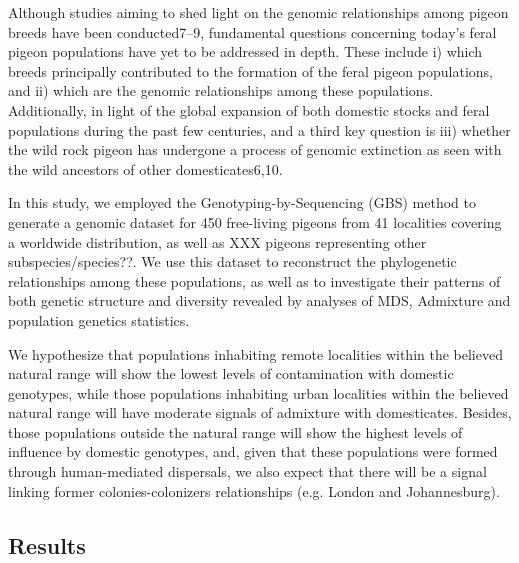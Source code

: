 \documentclass[twoside, british, a4paper]{article}
\begin{document}
\begin{multicols}{2}
Although studies aiming to shed light on the genomic relationships among pigeon breeds have been conducted7–9, fundamental questions concerning today's feral pigeon populations have yet to be addressed in depth. These include i) which breeds principally contributed to the formation of the feral pigeon populations, and ii) which are the genomic relationships among these populations. Additionally, in light of the global expansion of both domestic stocks and feral populations during the past few centuries, and a third key question is iii) whether the wild rock pigeon has undergone a process of genomic extinction as seen with the wild ancestors of other domesticates6,10. \

In this study, we employed the Genotyping-by-Sequencing (GBS) method to generate a genomic dataset for 450 free-living pigeons from 41 localities covering a worldwide distribution, as well as XXX pigeons representing other subspecies/species??. We use this dataset to reconstruct the phylogenetic relationships among these populations, as well as to investigate their patterns of both genetic structure and diversity revealed by analyses of MDS, Admixture and population genetics statistics. \

We hypothesize that populations inhabiting remote localities within the believed natural range will show the lowest levels of contamination with domestic genotypes, while those populations inhabiting urban localities within the believed natural range will have moderate signals of admixture with domesticates. Besides, those populations outside the natural range will show the highest levels of influence by domestic genotypes, and, given that these populations were formed through human-mediated dispersals, we also expect that there will be a signal linking former colonies-colonizers relationships (e.g. London and Johannesburg). \

\end{multicols}



\subsection*{Results}

\end{document}
